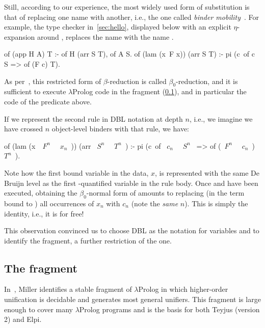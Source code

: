 \documentclass[a4paper, 11pt]{book}
\begin{document}
Still, according to our experience, the most widely used form of substitution
is that of replacing one name with another, i.e., the one called
\emph{binder mobility}~\cite{Miller2018MechanizedMR}. For example, the type
checker in~\cref{sec:hello}, displayed below with an explicit
$\eta$-expansion around , replaces the name  with the name
.

\begin{elpicode}
of (app H A) T :- of H (arr S T), of A S.
of (lam (x\ F x)) (arr S T) :- pi (c\ of c S => of (F c) T).
\end{elpicode}

\noindent
As per~\cite{10.1093/logcom/1.4.497}, this restricted form of $\beta$-reduction
is called $\beta_0$-reduction, and it is sufficient to execute $\lambda$Prolog
code in the \theotherfragment fragment (\cref{sec:llam}), and in particular the code of
the  predicate above.


If we represent the second rule in DBL notation at depth $n$, i.e., we imagine
we have crossed $n$ object-level binders with that rule, we have:

\begin{elpicode}
of (lam (x\ ~$F^n$~ ~$x_n$~)) (arr ~$S^n$~ ~$T^n$~) :-
  pi (c\ of ~$c_n$~ ~$S^n$~ => of (~$F^n$~ ~$c_n$~) ~$T^n$~).
\end{elpicode}

\noindent
Note how the first bound variable in the data, $x$, is represented with the
same De Bruijn level as the first -quantified variable in the rule
body. Once  and \elpi{=>} have been executed, obtaining the
$\beta_0$-normal form of  amounts to replacing (in the term
bound to ) all occurrences of $x_n$ with $c_n$ (note the \emph{same}
$n$). This is simply the identity, i.e., it is for free!


This observation convinced us to choose DBL as the notation for variables and
to identify the \thefragment fragment, a further restriction of the \theotherfragment one.

\subsection{The \theotherfragment fragment}\label{sec:llam}


In~\cite{10.1093/logcom/1.4.497}, Miller identifies a stable fragment of
$\lambda$Prolog in which higher-order unification is decidable and generates
most general unifiers. This fragment is large enough to cover many
$\lambda$Prolog programs and is the basis for both Teyjus (version 2) and
Elpi.
\end{document}

